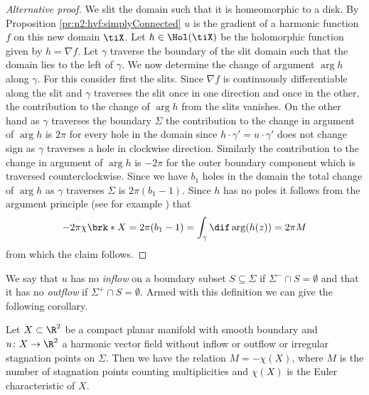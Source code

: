 \begin{proof}[Alternative proof]
  We slit the domain such that it is homeomorphic to a disk. By Proposition \ref{pr:n2:hvf:simplyConnected} $u$ is the gradient of a
  harmonic function $f$ on this new domain $\tiX$. Let $h\in\Hol(\tiX)$ be the holomorphic function given by $h=\nabla f$.
  Let $\gamma$ traverse the boundary of the slit domain such that the domain lies to the left of $\gamma$.
  We now determine the change of argument $\arg h$ along $\gamma$. For this
  consider first the slits. Since $\nabla f$ is continuously differentiable
  along the slit and $\gamma$ traverses the slit once in one direction and once in the other,
  the contribution to the change of $\arg h$ from the slits vanishes.
  On the other hand as $\gamma$ traverses the boundary $\Sigma$ the contribution to the change in
  argument of $\arg h$ is $2\pi$ for every hole in the domain 
  since $h\cdot\gamma'=u\cdot\gamma'$ does not change sign as $\gamma$ traverses a hole in clockwise direction.
  Similarly the contribution to the change in argument of $\arg h$ is $-2\pi$ for the outer boundary component
  which is traversed counterclockwise.
  Since we have $b_1$ holes in the domain the total change of $\arg h$ as $\gamma$ traverses $\Sigma$ is
  $2\pi(b_1-1)$.
  Since $h$ has no poles it follows from the argument principle (see for example \cite[Chapter VIII]{Gamelin2001}) that
  \begin{align*}
    -2\pi\chi\brk*{X}=2\pi(b_1-1)=\int_\gamma\dif\arg (h(z)) =  2\pi M
  \end{align*}
  from which the claim follows.
\end{proof}

We say that $u$ has no \emph{inflow} on a boundary subset $S\subseteq\Sigma$ if $\Sigma^-\cap S=\emptyset$ and
that it has no \emph{outflow} if $\Sigma^+\cap S=\emptyset$.
Armed with this definition we can give the following corollary.
\begin{corollary}[No in- or outflow]\label{co:n2_noInflowNoOutflow}
  Let $X\subset\R^2$ be a compact planar manifold with smooth boundary and $u\colon X\to\R^2$ a
  harmonic vector field without inflow or outflow 
  or irregular stagnation points on $\Sigma$. Then we have the relation $M=-\chi(X)$, where $M$ is the number of stagnation points counting multiplicities
  and $\chi(X)$ is the Euler characteristic of $X$.
\end{corollary}

